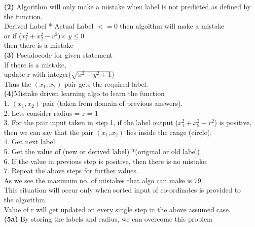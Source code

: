 \documentclass[11pt]{article}
\renewcommand\part[1]{\vspace{.10in}\textbf{(#1)}}
\begin{document}
\part{2} Algorithm will only make a mistake when label is not predicted as defined by the function.
\\Derived Label * Actual Label $<=$0 then algoithm will make a mistake
\\or if ($x_1^2+x_2^2-r^2$)$\times$ $y$$\leq 0$
\\then there is a mistake\\
\part{3} Pseudocode for given statement
\\If there is a mistake,
\\update r with  integer($\sqrt{x^2+y^2+1}$)
\\Thus the $(x_1,x_2)$ pair gets the required label.\\
\part{4}Mistake driven learning algo to learn the function
\\1. $(x_1,x_2)$ pair (taken from domain of previous answers).
\\2. Lets consider radius = r = 1
\\3. For the pair input taken in step 1, if the label output ($x_1^2+x_2^2-r^2$) is positive, then we can say that the pair $(x_1,x_2)$ lies inside the range (circle).
\\4. Get next label
\\5. Get the value of (new or derived label) *(original or old label)
\\6. If the value in previous step is positive, then there is no mistake.
\\7. Repeat the above steps for further values.
\\As we see the maximum no. of mistakes that algo can make is 79.
\\This situation will occur only when sorted input of co-ordinates is provided to the algorithm.
\\Value of r will get updated on every single step in the above assumed case.\\
\part{5a} By storing the labels and radius, we can overcome this problem\\
\end{document}
